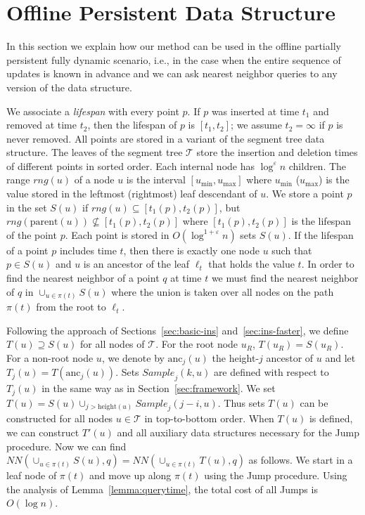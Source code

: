 \documentclass[12pt,a4paper,USenglish,cleveref, autoref, thm-restate]{article}
\newcommand{\Sample}{\mathit{Sample}}
\newcommand{\NN}{\mathit{NN}}
\newcommand{\mcT}{\mathcal{T}}
\newcommand{\eps}{\varepsilon}
\newcommand{\Sample}{\mathit{Sample}}
\newcommand{\NN}{\mathit{NN}}
\newcommand{\mcT}{\mathcal{T}}
\newcommand{\eps}{\varepsilon}
\newcommand{\Sample}{\mathit{Sample}}
\newcommand{\NN}{\mathit{NN}}
\newcommand{\mcT}{\mathcal{T}}
\newcommand{\eps}{\varepsilon}
\begin{document}
\section{Offline Persistent Data Structure}
\label{sec:persist}
In this section we explain how our method can be used in the offline partially persistent fully dynamic scenario, i.e., in the case when the entire sequence of updates is known in advance and we can ask nearest neighbor queries to any version of the data structure.

We associate a \emph{lifespan} with every point $p$. If $p$ was inserted at time $t_1$ and removed at time $t_2$, then the lifespan of $p$ is $[t_1,t_2]$; we assume $t_2=\infty$ if $p$ is never removed.  All points are stored in a variant of the segment tree data structure. The leaves of the segment tree $\mcT$ store the insertion and deletion times of different points in sorted order. Each internal node has $\log^{\eps} n$ children. The range $rng(u)$ of a node $u$ is the interval $[u_{\min},u_{\max}]$ where $u_{\min}$ ($u_{\max}$) is the value stored in the leftmost (rightmost) leaf descendant of $u$.  We store a point $p$ in the set $S(u)$ if $rng(u)\subseteq [t_{1}(p),t_{2}(p)]$, but $rng(\text{parent}(u))\not\subseteq [t_{1}(p),t_{2}(p)]$ where $[t_{1}(p),t_{2}(p)]$ is the lifespan of the point $p$. Each point is stored in $O(\log^{1+\eps} n)$ sets $S(u)$. If the lifespan of a point $p$ includes time $t$, then there is exactly one node $u$ such that $p\in S(u)$ and $u$ is an ancestor of the leaf $\ell_t$ that holds the value $t$.  In order to find the nearest neighbor of a point $q$ at time $t$ we must find the nearest neighbor of $q$ in $\cup_{u\in \pi(t)}S(u)$ where the union is taken over all nodes on the path $\pi(t)$ from the root to $\ell_t$.  

Following the approach of Sections~\ref{sec:basic-ins} and~\ref{sec:ins-faster}, we define $T(u)\supseteq S(u)$ for all nodes of $\mcT$. For the root node $u_R$, $T(u_R)=S(u_R)$. For a non-root node $u$, we denote by $\text{anc}_j(u)$ the height-$j$ ancestor of $u$ and let  $T_j(u)=T(\text{anc}_j(u))$. Sets $\Sample_j(k,u)$ are defined with respect to $T_j(u)$ in the same way as in Section~\ref{sec:framework}. We set $T(u)=S(u)\cup_{j>\text{height}(u)} \Sample_j(j-i,u)$. Thus sets $T(u)$ can be constructed for all nodes $u\in \mcT$ in top-to-bottom order. When $T(u)$ is defined, we can construct $T'(u)$ and all auxiliary data structures necessary for the Jump procedure. Now we can find $\NN(\cup _{u\in \pi(t)}S(u),q)=\NN(\cup _{u\in \pi(t)}T(u),q)$ as follows. We start in a leaf node of $\pi(t)$ and move up along $\pi(t)$ using the Jump procedure.  Using the analysis of Lemma~\ref{lemma:querytime}, the total cost of all Jumps is $O(\log n)$.
\end{document}
